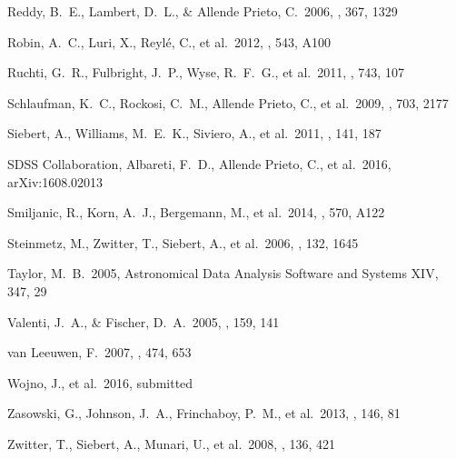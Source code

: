 \documentclass[preprint,trackchanges]{aastex}
\begin{document}
\begin{thebibliography}{dummy}
 Reddy, B.~E., Lambert, D.~L., \& Allende Prieto, C.\ 2006, \mnras, 367, 1329 

 Robin, A.~C., Luri, X., Reyl{\'e}, C., et al.\ 2012, \aap, 543, A100 

 Ruchti, G.~R., Fulbright, J.~P., Wyse, R.~F.~G., et al.\ 2011, \apj, 743, 107 

 Schlaufman, K.~C., Rockosi, C.~M., Allende Prieto, C., et al.\ 2009, \apj, 703, 2177 

 Siebert, A., Williams, M.~E.~K., Siviero, A., et al.\ 2011, \aj, 141, 187 

 SDSS Collaboration, Albareti, F.~D., Allende Prieto, C., et al.\ 2016, arXiv:1608.02013 

 Smiljanic, R., Korn, A.~J., Bergemann, M., et al.\ 2014, \aap, 570, A122 

 Steinmetz, M., Zwitter, T., Siebert, A., et al.\ 2006, \aj, 132, 1645 

 Taylor, M.~B.\ 2005, Astronomical Data Analysis Software and Systems XIV, 347, 29 

 Valenti, J.~A., \& Fischer, D.~A.\ 2005, \apjs, 159, 141 

 van Leeuwen, F.\ 2007, \aap, 474, 653 

 Wojno, J., et al.\ 2016, submitted

 Zasowski, G., Johnson, J.~A., Frinchaboy, P.~M., et al.\ 2013, \aj, 146, 81 

 Zwitter, T., Siebert, A., Munari, U., et al.\ 2008, \aj, 136, 421 

\end{thebibliography}

\clearpage
\end{document}
